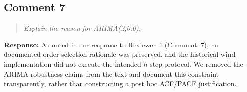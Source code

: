 \documentclass[11pt,a4paper]{article}
\newenvironment{reviewcomment}
  {\begin{quote}\itshape}
  {\end{quote}}
\newcommand{\response}{\noindent\textbf{Response:} }
\begin{document}
\subsection*{Comment 7}

\begin{reviewcomment}
Explain the reason for ARIMA(2,0,0).
\end{reviewcomment}

\response
As noted in our response to Reviewer~1 (Comment~7), no documented
order-selection rationale was preserved, and the historical wind implementation
did not execute the intended $h$-step protocol. We removed the ARIMA robustness
claims from the text and document this constraint transparently, rather than
constructing a post hoc ACF/PACF justification.
\end{document}

